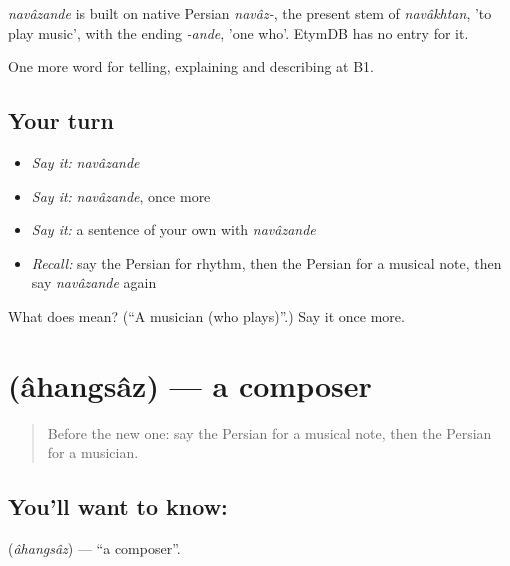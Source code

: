 \begin{cousinweb}
\emph{navâzande} is built on native Persian \emph{navâz-}, the present stem of \emph{navâkhtan}, 'to play music', with the ending \emph{-ande}, 'one who'. EtymDB has no entry for it.
\end{cousinweb}

\begin{grammarlens}[title={What you've built}]
One more word for telling, explaining and describing at B1.
\end{grammarlens}

\subsection*{Your turn}
\begin{itemize}
\raggedright
  \item \emph{Say it:} \emph{navâzande}
  \item \emph{Say it:} \emph{navâzande}, once more
  \item \emph{Say it:} a sentence of your own with \emph{navâzande}
  \item \emph{Recall:} say the Persian for rhythm, then the Persian for a musical note, then say \emph{navâzande} again
\end{itemize}

\begin{tcolorbox}[breakable,colback=teal!4,colframe=teal!35!black,title={Before you move on}]
What does  mean? (\textquotedblleft{}A musician (who plays)\textquotedblright{}.) Say it once more.
\end{tcolorbox}
\section[\texorpdfstring{\fa{آهنگساز} (âhangsâz)}{آهنگساز (âhangsâz)}]{ (âhangsâz) — a composer}

\label{lesson:FA-C520-ahangsaz}



\begin{quote}
Before the new one: say the Persian for a musical note, then the Persian for a musician.
\end{quote}

\subsection*{You'll want to know: }
\textbf{} (\emph{âhangsâz}) — \textquotedblleft{}a composer\textquotedblright{}.

